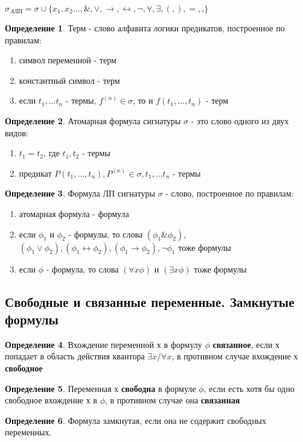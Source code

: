 \documentclass[a4paper]{article}
\theoremstyle{definition}
\newtheorem*{definition}{Определение}
\theoremstyle{remark}
\begin{document}
    $\sigma_{A\text{ЛП}} = \sigma \cup \{x_1, x_2\dots, \&, \vee, \rightarrow, \leftrightarrow, \neg, \forall, \exists, (, ), =, \textbf{,} \}$
    \begin{definition}
        Терм - слово алфавита логики предикатов, построенное по правилам:
        \begin{enumerate}
            \item символ переменной - терм
            \item константный символ - терм
            \item если $t_1,\dots t_n$ - термы, $f^{(n)}\in\sigma$, то и $f(t_1,\dots, t_n)$ - терм
        \end{enumerate}
    \end{definition}
    \begin{definition}
        Атомарная формула сигнатуры $\sigma$ - это слово одного из двух видов:
        \begin{enumerate}
            \item $t_1 = t_2$, где $t_1, t_2$ - термы
            \item предикат $P(t_1,\dots, t_n), P^{(n)}\in\sigma, t_1,\dots t_n$ - термы 
        \end{enumerate}
    \end{definition}
    \begin{definition}
        Формула ЛП сигнатуры $\sigma$ - слово, построенное по правилам:
        \begin{enumerate}
            \item атомарная формула - формула
            \item если $\phi_1$ и $\phi_2$ -  формулы, то слова $(\phi_1 \& \phi_2), $
            $(\phi_1 \vee \phi_2), (\phi_1 \leftrightarrow \phi_2), (\phi_1 \rightarrow \phi_2), \neg \phi_1$
            тоже формулы
            \item если $\phi$ - формула, то слова $(\forall x \phi)$ и $(\exists x \phi)$ тоже формулы
        \end{enumerate}
    \end{definition}
    \subsection{Свободные и связанные переменные. Замкнутые формулы}
    \begin{definition}
        Вхождение переменной х в формулу $\phi$ \textbf{связанное}, если х попадает в область действия квантора $\exists x / \forall x$,
        в противном случае вхождение х \textbf{свободное}
    \end{definition}
    \begin{definition}
        Переменная х \textbf{свободна} в формуле $\phi$, если есть хотя бы одно свободное вхождение х в $\phi$,
        в противном случае она \textbf{связанная}
    \end{definition}
    \begin{definition}
        Формула замкнутая, если она не содержит свободных переменных.
    \end{definition}
\end{document}
